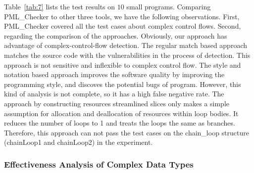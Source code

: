 Table~\ref{tab:7} lists the test results on $10$ small programs. Comparing PML\_Checker to other three tools, we have the following observations.
First,%
PML\_Checker covered all the test cases about complex control flows. %
Second, regarding the comparison of the approaches. Obviously, our approach has advantage of complex-control-flow detection. The regular match based approach matches the source code with the vulnerabilities in the process of detection. This approach is not sensitive and inflexible to complex control flow. The style and notation based approach improves the software quality by improving the programming style, and discoves the potential bugs of program. However, this kind of analysis is not complete, so it has a high false negative rate. The approach by constructing resources streamlined slices only makes a simple assumption for allocation and deallocation of resources within loop bodies. It reduces the number of loops to 1 and treats the loops the same as branches. Therefore, this approach can not pass the test cases on the chain\_loop structure (chainLoop1 and chainLoop2) in the experiment. \\


\subsubsection{Effectiveness Analysis of Complex Data Types}

\

